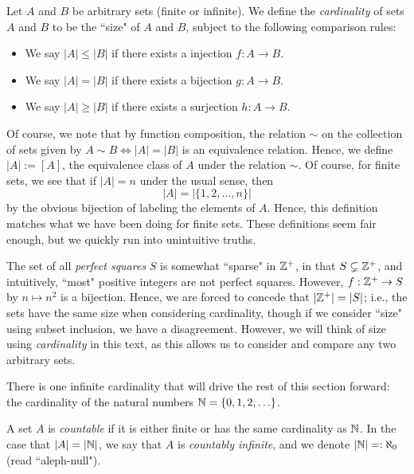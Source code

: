 \documentclass{article}
\begin{document}
\begin{definition}
Let $A$ and $B$ be arbitrary sets (finite or infinite). We define the \textit{cardinality} of sets $A$ and $B$ to be the ``size" of $A$ and $B$, subject to the following comparison rules:
\begin{itemize}
    \item We say $|A| \leq |B|$ if there exists a injection $f: A\to B$.
    \item We say $|A| = |B|$ if there exists a bijection $g: A\to B$.
    \item We say $|A| \geq |B|$ if there exists a surjection $h: A\to B$.
\end{itemize}
\end{definition}
Of course, we note that by function composition, the relation $\sim$ on the collection of sets given by $A\sim B \iff |A| = |B|$ is an equivalence relation. Hence, we define $|A| := [A]$, the equivalence class of $A$ under the relation $\sim$. Of course, for finite sets, we see that if $|A| = n$ under the usual sense, then
$$|A| = |\{1, 2, \ldots, n\}|$$
by the obvious bijection of labeling the elements of $A$. Hence, this definition matches what we have been doing for finite sets. These definitions seem fair enough, but we quickly run into unintuitive truths.

\begin{example}
The set of all \textit{perfect squares} $S$ is somewhat ``sparse" in $\mathbb Z^+$, in that $S \subsetneq \mathbb Z^+$, and intuitively, ``most" positive integers are not perfect squares. However, $f: \mathbb Z^+ \to S$ by $n\mapsto n^2$ is a bijection. Hence, we are forced to concede that $|\mathbb Z^+| = |S|$; i.e., the sets have the same size when considering cardinality, though if we consider ``size" using subset inclusion, we have a disagreement. However, we will think of size using \textit{cardinality} in this text, as this allows us to consider and compare any two arbitrary sets.
\end{example}

\newpage
There is one infinite cardinality that will drive the rest of this section forward: the cardinality of the natural numbers $\mathbb N = \{0, 1, 2, \ldots\}$.

\begin{definition}
A set $A$ is \textit{countable} if it is either finite or has the same cardinality as $\mathbb N$. In the case that $|A| = |\mathbb N|$, we say that $A$ is \textit{countably infinite}, and we denote $|\mathbb N| =: \aleph_0$ (read ``aleph-null").
\end{definition}
\end{document}
